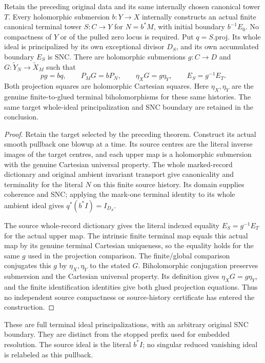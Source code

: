 \begin{theorem}
\label{hir:original-canonical-boundary-principalization-smooth}
\leanok
Retain the preceding original data and its same internally chosen
canonical tower $T$.  Every holomorphic submersion $b:Y\to X$ internally
constructs an actual finite canonical terminal tower $S:C\to Y$ for
$N=b^*M$, with initial boundary $b^{-1}E_0$.  No compactness of $Y$ or
of the pulled zero locus is required.  Put $q=S.\mathrm{proj}$.
Its whole ideal is principalized by its own exceptional divisor $D_S$,
and its own accumulated boundary $E_S$ is SNC.  There are holomorphic
submersions $g:C\to D$ and
$G:\widetilde Y_N\to\widetilde X_M$ such that
\[
 pg=bq,\qquad P_MG=bP_N,\qquad
 \eta_XG=g\eta_Y,\qquad E_S=g^{-1}E_T.
\]
Both projection squares are holomorphic Cartesian squares.  Here
$\eta_X,\eta_Y$ are the genuine finite-to-glued terminal
biholomorphisms for these same histories.  The same target whole-ideal
principalization and SNC boundary are retained in the conclusion.
\end{theorem}
\begin{proof}
Retain the target selected by the preceding theorem.  Construct its
actual smooth pullback one blowup at a time.  Its source centres are the
literal inverse images of the target centres, and each upper map is a
holomorphic submersion with the genuine Cartesian universal property.
The whole marked-record dictionary and original ambient invariant
transport give canonicality and terminality for the literal $N$ on this
finite source history.  Its domain supplies coherence and SNC; applying
the mark-one terminal identity to its whole ambient ideal gives
$q^*(b^*I)=I_{D_S}$.

The source whole-record dictionary gives the literal indexed equality
$E_S=g^{-1}E_T$ for the actual upper map.  The intrinsic finite terminal
map equals this actual map by its genuine terminal Cartesian uniqueness,
so the equality holds for the same $g$ used in the projection comparison.
The finite/global comparison conjugates this $g$ by $\eta_X,\eta_Y$ to
the stated $G$.  Biholomorphic conjugation preserves submersion and the
Cartesian universal property.  Its definition gives
$\eta_XG=g\eta_Y$, and the finite identification identities give both
glued projection equations.  Thus no independent source compactness or
source-history certificate has entered the construction.
\end{proof}

\begin{remark}
These are full terminal ideal principalizations, with an arbitrary
original SNC boundary.  They are distinct from the stopped prefix used
for embedded resolution.  The source ideal is the literal $b^*I$;
no singular reduced vanishing ideal is relabeled as this pullback.
\end{remark}
